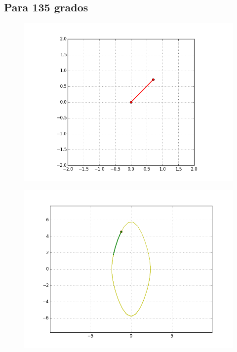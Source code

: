 \documentclass[12pt]{article}
\begin{document}
\subsection{Para 135 grados}
\begin{figure}[H]
\includegraphics[scale=.6]{135p}
\end{figure}
\begin{figure}[H]
\includegraphics[scale=.6]{135e}
\end{figure}
\end{document}
